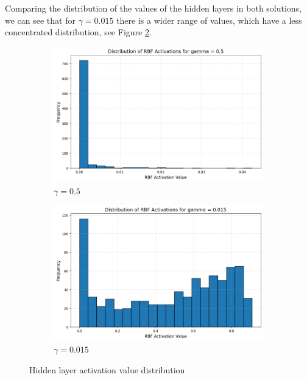 \documentclass{article}
\begin{document}
\begin{enumerate}
Comparing the distribution of the values of the hidden layers in both
solutions, we can see that for $\gamma=0.015$ there is a wider range of
values, which have a less concentrated distribution, see Figure
\ref{fig:rbf-dist}.
\begin{figure}[H]
    \centering
    \centering
    \begin{subfigure}{0.45\linewidth}
        \centering
        \includegraphics[width=\linewidth]{img/RBF_Activation_500.png}
        \caption{$\gamma=0.5$}
    \end{subfigure}
    \hfill %
    \begin{subfigure}{0.45\linewidth}
        \centering
        \includegraphics[width=\linewidth]{img/RBF_Activation_15.png}
        \caption{$\gamma=0.015$}
        \label{fig:rbf-dist-15}
    \end{subfigure}
    \caption{Hidden layer activation value distribution}
    \label{fig:rbf-dist}
\end{figure}


\end{enumerate}
\end{document}
